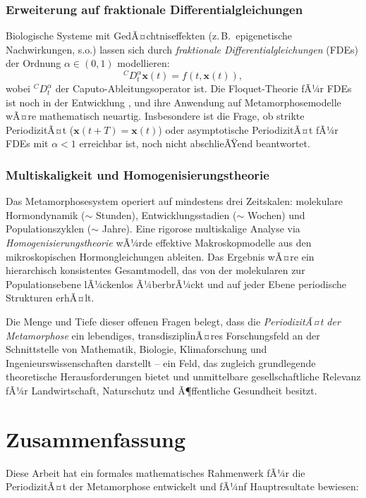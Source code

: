 ﻿\documentclass[12pt, a4paper]{article}
\theoremstyle{definition}
\begin{document}
\subsubsection{Erweiterung auf fraktionale Differentialgleichungen}
Biologische Systeme mit GedÃ¤chtniseffekten (z.\,B.\ epigenetische Nachwirkungen,
s.o.) lassen sich durch \emph{fraktionale Differentialgleichungen} (FDEs) der
Ordnung $\alpha \in (0,1)$ modellieren:
\[
  {}^C D^\alpha_t \bm{x}(t) = f(t, \bm{x}(t)),
\]
wobei ${}^C D^\alpha_t$ der Caputo-Ableitungsoperator ist. Die Floquet-Theorie fÃ¼r
FDEs ist noch in der Entwicklung \cite{Zhou2016}, und ihre Anwendung auf
Metamorphosemodelle wÃ¤re mathematisch neuartig. Insbesondere ist die Frage,
ob strikte PeriodizitÃ¤t ($\bm{x}(t+T) = \bm{x}(t)$) oder asymptotische
PeriodizitÃ¤t fÃ¼r FDEs mit $\alpha < 1$ erreichbar ist, noch nicht abschlieÃŸend
beantwortet.

\subsubsection{Multiskaligkeit und Homogenisierungstheorie}
Das Metamorphosesystem operiert auf mindestens drei Zeitskalen: molekulare
Hormondynamik ($\sim$ Stunden), Entwicklungsstadien ($\sim$ Wochen) und
Populationszyklen ($\sim$ Jahre). Eine rigorose multiskalige Analyse via
\emph{Homogenisierungstheorie} \cite{Pavliotis2008} wÃ¼rde effektive
Makroskopmodelle aus den mikroskopischen Hormongleichungen ableiten. Das
Ergebnis wÃ¤re ein hierarchisch konsistentes Gesamtmodell, das von der
molekularen zur Populationsebene lÃ¼ckenlos Ã¼berbrÃ¼ckt und auf jeder Ebene
periodische Strukturen erhÃ¤lt.

Die Menge und Tiefe dieser offenen Fragen belegt, dass die \emph{PeriodizitÃ¤t der
Metamorphose} ein lebendiges, transdisziplinÃ¤res Forschungsfeld an der Schnittstelle
von Mathematik, Biologie, Klimaforschung und Ingenieurswissenschaften darstellt --
ein Feld, das zugleich grundlegende theoretische Herausforderungen bietet und
unmittelbare gesellschaftliche Relevanz fÃ¼r Landwirtschaft, Naturschutz und
Ã¶ffentliche Gesundheit besitzt.

\section{Zusammenfassung}

Diese Arbeit hat ein formales mathematisches Rahmenwerk fÃ¼r die PeriodizitÃ¤t der
Metamorphose entwickelt und fÃ¼nf Hauptresultate bewiesen:
\end{document}
